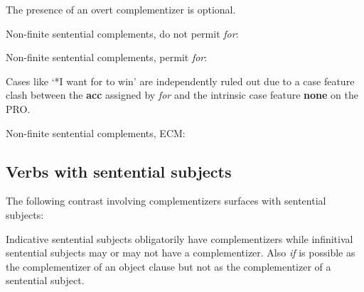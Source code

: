 
The presence of an overt complementizer is optional.

Non-finite sentential complements, do not permit {\em for}:


Non-finite sentential complements, permit {\em for}:


Cases like `*I want for to win' are independently ruled out due to a 
case feature clash between the {\bf acc} assigned by {\em for} and the
intrinsic case feature {\bf none} on the PRO.

Non-finite sentential complements, ECM:



\subsection{Verbs with sentential subjects}
The following contrast involving complementizers surfaces with sentential
subjects:


Indicative sentential subjects obligatorily have complementizers while
infinitival sentential subjects may or may not have a complementizer. 
Also {\em if} is possible as the complementizer of an object clause
but not as the complementizer of a sentential subject. 


